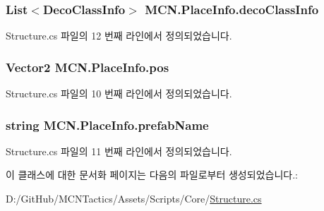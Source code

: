 \subsubsection[{\texorpdfstring{deco\+Class\+Info}{decoClassInfo}}]{\setlength{\rightskip}{0pt plus 5cm}List$<${\bf Deco\+Class\+Info}$>$ M\+C\+N.\+Place\+Info.\+deco\+Class\+Info}\hypertarget{class_m_c_n_1_1_place_info_a52b0fe979b2c0403be64f1f42262e086}{}\label{class_m_c_n_1_1_place_info_a52b0fe979b2c0403be64f1f42262e086}


Structure.\+cs 파일의 12 번째 라인에서 정의되었습니다.

\subsubsection[{\texorpdfstring{pos}{pos}}]{\setlength{\rightskip}{0pt plus 5cm}Vector2 M\+C\+N.\+Place\+Info.\+pos}\hypertarget{class_m_c_n_1_1_place_info_ab61c1f49a0d342fb132a2af87ee7c322}{}\label{class_m_c_n_1_1_place_info_ab61c1f49a0d342fb132a2af87ee7c322}


Structure.\+cs 파일의 10 번째 라인에서 정의되었습니다.

\subsubsection[{\texorpdfstring{prefab\+Name}{prefabName}}]{\setlength{\rightskip}{0pt plus 5cm}string M\+C\+N.\+Place\+Info.\+prefab\+Name}\hypertarget{class_m_c_n_1_1_place_info_aedf20cfad59c8298386c61bdcc266457}{}\label{class_m_c_n_1_1_place_info_aedf20cfad59c8298386c61bdcc266457}


Structure.\+cs 파일의 11 번째 라인에서 정의되었습니다.



이 클래스에 대한 문서화 페이지는 다음의 파일로부터 생성되었습니다.\+:\begin{DoxyCompactItemize}
\item 
D\+:/\+Git\+Hub/\+M\+C\+N\+Tactics/\+Assets/\+Scripts/\+Core/\hyperlink{_structure_8cs}{Structure.\+cs}\end{DoxyCompactItemize}
